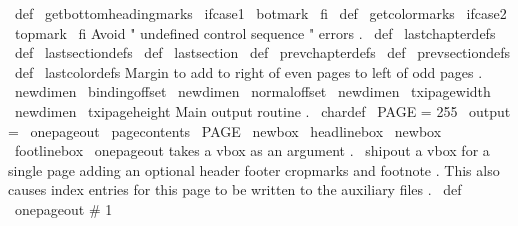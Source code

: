 \
def
\
getbottomheadingmarks
{
\
ifcase1
\
botmark
\
fi
}
\
def
\
getcolormarks
{
\
ifcase2
\
topmark
\
fi
}
%
Avoid
"
undefined
control
sequence
"
errors
.
\
def
\
lastchapterdefs
{
}
\
def
\
lastsectiondefs
{
}
\
def
\
lastsection
{
}
\
def
\
prevchapterdefs
{
}
\
def
\
prevsectiondefs
{
}
\
def
\
lastcolordefs
{
}
%
Margin
to
add
to
right
of
even
pages
to
left
of
odd
pages
.
\
newdimen
\
bindingoffset
\
newdimen
\
normaloffset
\
newdimen
\
txipagewidth
\
newdimen
\
txipageheight
%
Main
output
routine
.
%
\
chardef
\
PAGE
=
255
\
output
=
{
\
onepageout
{
\
pagecontents
\
PAGE
}
}
\
newbox
\
headlinebox
\
newbox
\
footlinebox
%
\
onepageout
takes
a
vbox
as
an
argument
.
%
\
shipout
a
vbox
for
a
single
page
adding
an
optional
header
footer
%
cropmarks
and
footnote
.
This
also
causes
index
entries
for
this
page
%
to
be
written
to
the
auxiliary
files
.
%
\
def
\
onepageout
#
1

